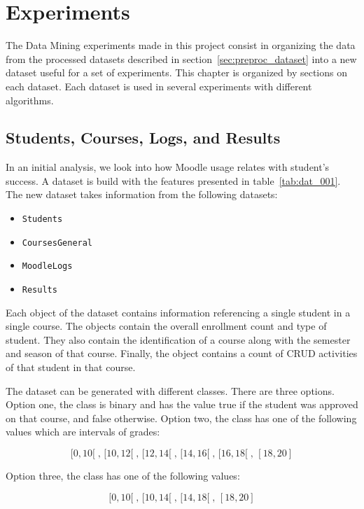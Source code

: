 \chapter{Experiments}
\label{sec:exps}

The Data Mining experiments made in this project consist in organizing the data
from the processed datasets described in section~\ref{sec:preproc_dataset} into
a new dataset useful for a set of experiments. This chapter is organized by
sections on each dataset. Each dataset is used in several experiments with
different algorithms.

\section{Students, Courses, Logs, and Results}
\label{sec:exp_001_002}

In an initial analysis, we look into how Moodle usage relates with student's
success. A dataset is build with the features presented in
table~\ref{tab:dat_001}. The new dataset takes information from the following
datasets:

\begin{itemize}
    \item \texttt{Students}
    \item \texttt{CoursesGeneral}
    \item \texttt{MoodleLogs}
    \item \texttt{Results}
\end{itemize}

Each object of the dataset contains information referencing a single student in
a single course. The objects contain the overall enrollment count and type of
student. They also contain the identification of a course along with the
semester and season of that course. Finally, the object contains a count of
CRUD activities of that student in that course.

The dataset can be generated with different classes. There are three options.
Option one, the class is binary and has the value true if the student was
approved on that course, and false otherwise. Option two, the class has one of
the following values which are intervals of grades:

\[
    [0, 10[\;,\, [10, 12[\;,\, [12, 14[\;,\, [14, 16[\;,\, [16, 18[\;,\, [18, 20]
\]

Option three, the class has one of the following values:

\[
    [0, 10[\;,\, [10, 14[\;,\, [14, 18[\;,\, [18, 20]
\]


